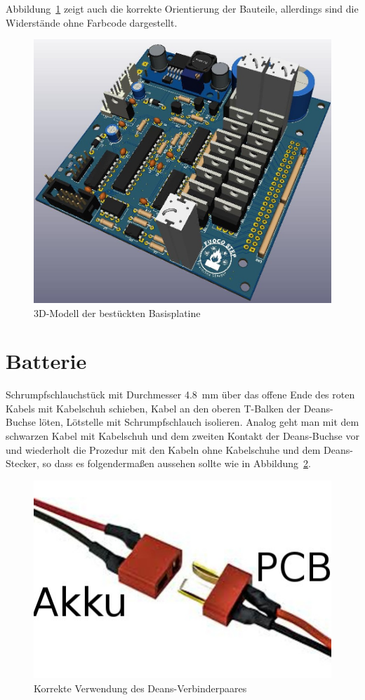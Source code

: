 \documentclass[paper=a4, open=any, numbers=noenddot]{scrbook}
\begin{document}
				Abbildung~\ref{fig:base3d} zeigt auch die korrekte Orientierung der Bauteile, allerdings sind die Widerstände ohne Farbcode dargestellt.

				\begin{figure}
					\centering\includegraphics[width=\textwidth]{base3d}
					\caption{3D-Modell der bestückten Basisplatine}
					\label{fig:base3d}
				\end{figure}

		\section{Batterie}

			Schrumpfschlauchstück mit Durchmesser \SI{4,8}{\milli\metre} über das offene Ende des roten Kabels mit Kabelschuh schieben, Kabel an den oberen T-Balken der Deans-Buchse löten, Lötstelle mit Schrumpfschlauch isolieren. Analog geht man mit dem schwarzen Kabel mit Kabelschuh und dem zweiten Kontakt der Deans-Buchse vor und wiederholt die Prozedur mit den Kabeln ohne Kabelschuhe und dem Deans-Stecker, so dass es folgendermaßen aussehen sollte wie in Abbildung~\ref{fig:deans}.

			\begin{figure}
				\centering\includegraphics[width=.35\textwidth]{deans}
				\caption{Korrekte Verwendung des Deans-Verbinder\-paares}
				\label{fig:deans}
			\end{figure}
\end{document}
